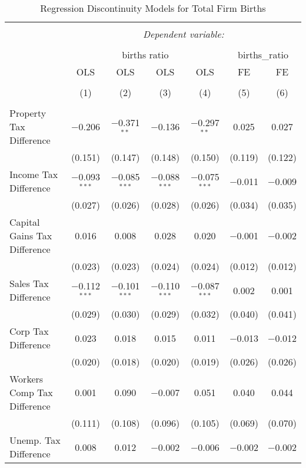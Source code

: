 
\begin{table}[!htbp] \centering 
  \caption{Regression Discontinuity Models for  Total Firm Births} 
  \label{--rd} 
\begin{tabular}{@{\extracolsep{5pt}}lcccccc} 
\\[-1.8ex]\hline 
\hline \\[-1.8ex] 
 & \multicolumn{6}{c}{\textit{Dependent variable:}} \\ 
\cline{2-7} 
\\[-1.8ex] & \multicolumn{4}{c}{births ratio} & \multicolumn{2}{c}{births\_ratio} \\ 
 & OLS & OLS & OLS & OLS & FE & FE \\ 
\\[-1.8ex] & (1) & (2) & (3) & (4) & (5) & (6)\\ 
\hline \\[-1.8ex] 
 Property Tax Difference & $-$0.206 & $-$0.371$^{**}$ & $-$0.136 & $-$0.297$^{**}$ & 0.025 & 0.027 \\ 
  & (0.151) & (0.147) & (0.148) & (0.150) & (0.119) & (0.122) \\ 
  Income Tax Difference & $-$0.093$^{***}$ & $-$0.085$^{***}$ & $-$0.088$^{***}$ & $-$0.075$^{***}$ & $-$0.011 & $-$0.009 \\ 
  & (0.027) & (0.026) & (0.028) & (0.026) & (0.034) & (0.035) \\ 
  Capital Gains Tax Difference & 0.016 & 0.008 & 0.028 & 0.020 & $-$0.001 & $-$0.002 \\ 
  & (0.023) & (0.023) & (0.024) & (0.024) & (0.012) & (0.012) \\ 
  Sales Tax Difference & $-$0.112$^{***}$ & $-$0.101$^{***}$ & $-$0.110$^{***}$ & $-$0.087$^{***}$ & 0.002 & 0.001 \\ 
  & (0.029) & (0.030) & (0.029) & (0.032) & (0.040) & (0.041) \\ 
  Corp Tax Difference & 0.023 & 0.018 & 0.015 & 0.011 & $-$0.013 & $-$0.012 \\ 
  & (0.020) & (0.018) & (0.020) & (0.019) & (0.026) & (0.026) \\ 
  Workers Comp Tax Difference & 0.001 & 0.090 & $-$0.007 & 0.051 & 0.040 & 0.044 \\ 
  & (0.111) & (0.108) & (0.096) & (0.105) & (0.069) & (0.070) \\ 
  Unemp. Tax Difference & 0.008 & 0.012 & $-$0.002 & $-$0.006 & $-$0.002 & $-$0.002 \\ 

\end{tabular}
\end{table}
